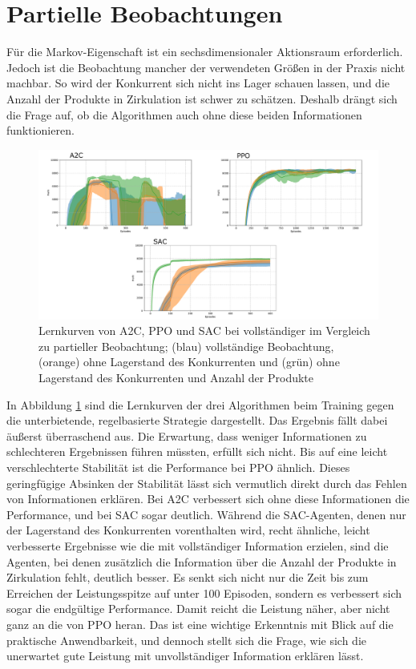 \section{Partielle Beobachtungen}
\label{section:partial_markov}
Für die Markov-Eigenschaft ist ein sechsdimensionaler Aktionsraum erforderlich.
Jedoch ist die Beobachtung mancher der verwendeten Größen in der Praxis nicht machbar.
So wird der Konkurrent sich nicht ins Lager schauen lassen, und die Anzahl der Produkte in Zirkulation ist schwer zu schätzen.
Deshalb drängt sich die Frage auf, ob die Algorithmen auch ohne diese beiden Informationen funktionieren.

\begin{figure}[htb]
	\centering
	\includegraphics[width=\textwidth]{main/partial_observation.pdf}
	\caption{Lernkurven von A2C, PPO und SAC bei vollständiger im Vergleich zu partieller Beobachtung; (blau) vollständige Beobachtung, (orange) ohne Lagerstand des Konkurrenten und (grün) ohne Lagerstand des Konkurrenten und Anzahl der Produkte
	}
	\label{graphic:PartialObservation}
\end{figure}

In Abbildung \ref{graphic:PartialObservation} sind die Lernkurven der drei Algorithmen beim Training gegen die unterbietende, regelbasierte Strategie dargestellt.
Das Ergebnis fällt dabei äußerst überraschend aus.
Die Erwartung, dass weniger Informationen zu schlechteren Ergebnissen führen müssten, erfüllt sich nicht.
Bis auf eine leicht verschlechterte Stabilität ist die Performance bei PPO ähnlich.
Dieses geringfügige Absinken der Stabilität lässt sich vermutlich direkt durch das Fehlen von Informationen erklären.
Bei A2C verbessert sich ohne diese Informationen die Performance, und bei SAC sogar deutlich.
Während die SAC-Agenten, denen nur der Lagerstand des Konkurrenten vorenthalten wird, recht ähnliche, leicht verbesserte Ergebnisse wie die mit vollständiger Information erzielen, sind die Agenten, bei denen zusätzlich die Information über die Anzahl der Produkte in Zirkulation fehlt, deutlich besser.
Es senkt sich nicht nur die Zeit bis zum Erreichen der Leistungsspitze auf unter 100 Episoden, sondern es verbessert sich sogar die endgültige Performance.
Damit reicht die Leistung näher, aber nicht ganz an die von PPO heran.
Das ist eine wichtige Erkenntnis mit Blick auf die praktische Anwendbarkeit, und dennoch stellt sich die Frage, wie sich die unerwartet gute Leistung mit unvollständiger Information erklären lässt.

